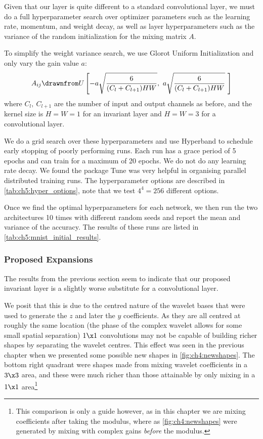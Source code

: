 Given that our layer is quite different to a standard convolutional layer, we
must do a full hyperparameter search over optimizer parameters such as the
learning rate, momentum, and weight decay, as well as layer hyperparameters 
such as the variance of the random initialization for the mixing matrix $A$.

To simplify the weight variance search, we use Glorot Uniform Initialization
\cite{glorot_understanding_2010} and only vary the gain value $a$:
%
\begin{equation}
  A_{ij} \drawnfrom U\left[ -a\sqrt{\frac{6}{(C_l + C_{l+1})HW}},\ a\sqrt{\frac{6}{(C_l + C_{l+1})HW}}\
  \right] \label{eq:ch5:glorot}
\end{equation}
%
where $C_l,\ C_{l+1}$ are the number of input and output channels as before, and
the kernel size is $H = W = 1$ for an invariant layer and $H = W= 3$ for a
convolutional layer.

We do a grid search over these hyperparameters and use Hyperband
\cite{li_hyperband:_2016} to schedule early stopping of poorly performing runs.
Each run has a grace period of 5 epochs and can train for a maximum of 20
epochs. We do not do any learning rate decay.  We found the package Tune
\cite{liaw2018tune} was very helpful in organising parallel distributed training
runs.  
The hyperparameter options are described in
\autoref{tab:ch5:hyper_options}, note that we test $4^4=256$ different options.

Once we find the optimal hyperparameters for each network, we then run the two
architectures 10 times with different random seeds and report the mean and variance of
the accuracy. The results of these runs are listed in
\autoref{tab:ch5:mnist_initial_results}.


\subsubsection{Proposed Expansions}\label{sec:ch5:mnist_newlayer}
The results from the previous section seem to indicate that our proposed
invariant layer is a slightly worse substitute for a convolutional layer.

We posit that this is due to the centred nature of the wavelet bases that were
used to generate the $z$ and later the $y$ coefficients. As they are all centred
at roughly the same location (the phase of the complex wavelet allows for some
small spatial separation) $1\x 1$ convolutions may not be capable of building
richer shapes by separating the wavelet centres. This effect was seen in the
previous chapter when we presented some possible new shapes in
\autoref{fig:ch4:newshapes}. The bottom right quadrant were shapes made from
mixing wavelet coefficients in a $3\x 3$ area, and these were much richer than
those attainable by only mixing in a $1\x 1$ area\footnote{This comparison is
only a guide however, as in this chapter we are mixing coefficients after taking
the modulus, where as \autoref{fig:ch4:newshapes} were generated by mixing with
complex gains \emph{before} the modulus.}

